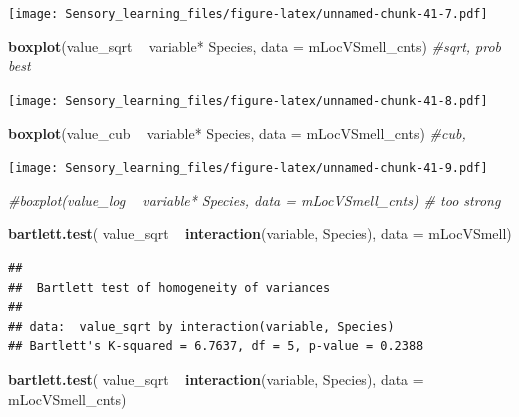 \documentclass[]{article}
\newenvironment{Shaded}{\begin{snugshade}}{\end{snugshade}}
\newcommand{\KeywordTok}[1]{\textcolor[rgb]{0.13,0.29,0.53}{\textbf{{#1}}}}
\newcommand{\DataTypeTok}[1]{\textcolor[rgb]{0.13,0.29,0.53}{{#1}}}
\newcommand{\StringTok}[1]{\textcolor[rgb]{0.31,0.60,0.02}{{#1}}}
\newcommand{\CommentTok}[1]{\textcolor[rgb]{0.56,0.35,0.01}{\textit{{#1}}}}
\newcommand{\NormalTok}[1]{{#1}}
\begin{document}
\texttt{[image: Sensory\_learning\_files/figure-latex/unnamed-chunk-41-7.pdf]}

\begin{Shaded}
\begin{Highlighting}[]
\KeywordTok{boxplot}\NormalTok{(value_sqrt ~}\StringTok{  }\NormalTok{variable*}\StringTok{ }\NormalTok{Species, }\DataTypeTok{data =} \NormalTok{mLocVSmell_cnts) }\CommentTok{#sqrt, prob best}
\end{Highlighting}
\end{Shaded}

\texttt{[image: Sensory\_learning\_files/figure-latex/unnamed-chunk-41-8.pdf]}

\begin{Shaded}
\begin{Highlighting}[]
\KeywordTok{boxplot}\NormalTok{(value_cub ~}\StringTok{  }\NormalTok{variable*}\StringTok{ }\NormalTok{Species, }\DataTypeTok{data =} \NormalTok{mLocVSmell_cnts) }\CommentTok{#cub, }
\end{Highlighting}
\end{Shaded}

\texttt{[image: Sensory\_learning\_files/figure-latex/unnamed-chunk-41-9.pdf]}

\begin{Shaded}
\begin{Highlighting}[]
\CommentTok{#boxplot(value_log ~  variable* Species, data = mLocVSmell_cnts) # too strong}

\KeywordTok{bartlett.test}\NormalTok{( value_sqrt ~}\StringTok{  }\KeywordTok{interaction}\NormalTok{(variable, Species), }\DataTypeTok{data =} \NormalTok{mLocVSmell)}
\end{Highlighting}
\end{Shaded}

\begin{verbatim}
## 
##  Bartlett test of homogeneity of variances
## 
## data:  value_sqrt by interaction(variable, Species)
## Bartlett's K-squared = 6.7637, df = 5, p-value = 0.2388
\end{verbatim}

\begin{Shaded}
\begin{Highlighting}[]
\KeywordTok{bartlett.test}\NormalTok{( value_sqrt ~}\StringTok{  }\KeywordTok{interaction}\NormalTok{(variable, Species), }\DataTypeTok{data =} \NormalTok{mLocVSmell_cnts)}
\end{Highlighting}
\end{Shaded}
\end{document}
